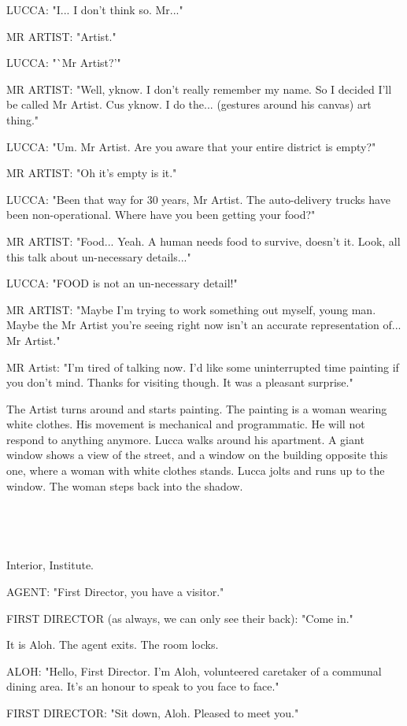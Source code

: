 \documentclass[11pt]{article}
\begin{document}
LUCCA: "I... I don't think so. Mr..."

MR ARTIST: "Artist."

LUCCA: "`Mr Artist?'"

MR ARTIST: "Well, yknow. 
I don't really remember my name. So I decided I'll be called Mr Artist.
Cus yknow. I do the... (gestures around his canvas) art thing."

LUCCA: "Um. Mr Artist. Are you aware that your entire district is empty?"

MR ARTIST: "Oh it's empty is it."

LUCCA: "Been that way for 30 years, Mr Artist.
The auto-delivery trucks have been non-operational. 
Where have you been getting your food?"

MR ARTIST: "Food... Yeah. A human needs food to survive, doesn't it.
Look, all this talk about un-necessary details..."

LUCCA: "FOOD is not an un-necessary detail!"

MR ARTIST: "Maybe I'm trying to work something out myself, young man. 
Maybe the Mr Artist you're seeing right now isn't an accurate representation of... Mr Artist."

MR Artist: "I’m tired of talking now. 
I’d like some uninterrupted time painting if you don’t mind. 
Thanks for visiting though. 
It was a pleasant surprise."

The Artist turns around and starts painting. 
The painting is a woman wearing white clothes. 
His movement is mechanical and programmatic. 
He will not respond to anything anymore. 
Lucca walks around his apartment. 
A giant window shows a view of the street, and a window on the building opposite this one, where a woman with white clothes stands. 
Lucca jolts and runs up to the window. 
The woman steps back into the shadow. 

\ 

\ 

Interior, Institute.

AGENT: "First Director, you have a visitor."

FIRST DIRECTOR (as always, we can only see their back): "Come in."

It is Aloh.
The agent exits. The room locks.

ALOH: "Hello, First Director. 
I'm Aloh, volunteered caretaker of a communal dining area.
It's an honour to speak to you face to face."

FIRST DIRECTOR: "Sit down, Aloh. 
Pleased to meet you."
\end{document}
